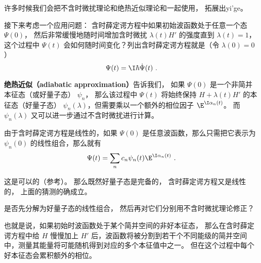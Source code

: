 

许多时候我们会把不含时微扰理论和绝热近似理论和一起使用， 拓展出yi'ge。

接下来考虑一个应用问题： 含时薛定谔方程中如果初始波函数处于任意一个态 $\Psi(0)$， 然后非常缓慢地随时间增加含时微扰 $\lambda(t) H'$ 的强度直到 $\lambda(t)=1$， 这个过程中 $\Psi(t)$ 会如何随时间变化？列出含时薛定谔方程就是（令 $\lambda(0)=0$）
\begin{equation}
[H + \lambda(t)H']\Psi(t) = \I\hbar\dot \Psi(t)~.
\end{equation}


\textbf{绝热近似（adiabatic approximation）}告诉我们， 如果 $\Psi(0)$ 是一个非简并本征态（或好量子态） $\psi_n$， 那么该过程中 $\Psi(t)$ 将始终保持 $H+\lambda(t) H'$ 的本征态（好量子态） $\psi_n(\lambda)$，但需要乘以一个额外的相位因子 $\E^{\I\alpha_n(t)}$。 而 $\psi_n(\lambda)$ 又可以进一步通过不含时微扰进行计算。

由于含时薛定谔方程是线性的，如果 $\Psi(0)$ 是任意波函数，那么只需把它表示为 $\psi_n(0)$ 的线性组合，那么就有
\begin{equation}
\Psi(t) = \sum_n c_n \psi_n(t) \E^{\I\alpha_n(t)}~.
\end{equation}


这是可以的（参考\cite{GriffQ}）。 那么既然好量子态是完备的， 含时薛定谔方程又是线性的， 上面的猜测的确成立。

是否先分解为好量子态的线性组合， 然后再对它们分别用不含时微扰理论修正？

也就是说，如果初始时波函数处于某个简并空间的非好本征态， 那么在含时薛定谔方程中给 $H$ 慢慢加上 $H'$ 后，波函数将被分割到若干个不同能级的简并空间中，测量其能量将可能随机得到对应的多个本征值中之一。 但在这个过程中每个好本征态会累积额外的相位。
